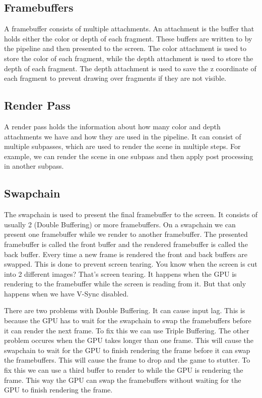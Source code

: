 \documentclass[12pt]{report} \usepackage{preamble}
\begin{document}
\subsection{Framebuffers}

A framebuffer consists of multiple attachments. An attachment is the buffer
that holds either the color or depth of each fragment.
These buffers are written to by the pipeline and then presented to the screen.
The color attachment is used to store the color of each fragment,
while the depth attachment is used to store the depth of each fragment.
The depth attachment is used to save the z coordinate of each fragment to prevent
drawing over fragments if they are not visible. \cite{framebuffers}

\subsection{Render Pass}

A render pass holds the information about how many color and depth attachments
we have and how they are used in the pipeline.
It can consist of multiple subpasses, which are used to render the scene in multiple steps.
For example, we can render the scene
in one subpass and then apply post processing in another subpass. \cite{render-pass}

\subsection{Swapchain}

The swapchain is used to present the final framebuffer to the screen.
It consists of usually 2 (Double Buffering) or more framebuffers.
On a swapchain we can present one framebuffer while we render to another framebuffer.
The presented framebuffer is called the front buffer and the rendered framebuffer
is called the back buffer. Every time a new frame is rendered the
front and back buffers are swapped. This is done to prevent screen tearing.
You know when the screen is cut into 2 different images? That's screen tearing.
It happens when the GPU is rendering to the framebuffer while the screen is reading from it.
But that only happens when we have V-Sync disabled.

There are two problems with Double Buffering. It can cause input lag.
This is because the GPU has to wait for the swapchain to swap the framebuffers
before it can render the next frame. To fix this we can use Triple Buffering.
The other problem occures when the GPU takes longer than one frame.
This will cause the swapchain to wait for the GPU to finish rendering the frame
before it can swap the framebuffers. This will cause the frame
to drop and the game to stutter. To fix this we can use a third buffer
to render to while the GPU is rendering the frame. This way the GPU can
swap the framebuffers without waiting for the GPU to finish rendering the frame. \cite{swapchain}
\end{document}
